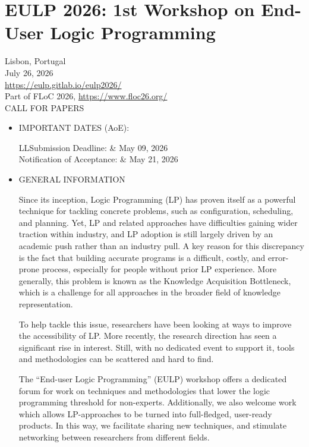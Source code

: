 \documentclass[prodmode,acmtecs]{acmsmall} %
\begin{document}
\section{EULP 2026: 1st Workshop on End-User Logic Programming}\label{EULP2026}  Lisbon, Portugal\\ 
  July 26, 2026\\ 
  \href{https://eulp.gitlab.io/eulp2026/}{https://eulp.gitlab.io/eulp2026/}\\ 
  Part of FLoC 2026, \href{https://www.floc26.org/}{https://www.floc26.org/}\\ 
CALL FOR PAPERS  

\begin{itemize}\item  IMPORTANT DATES (AoE): 
 
\begin{tabulary}{\linewidth}{LL}Submission Deadline:  & May 09, 2026 \\
Notification of Acceptance:  & May 21, 2026 \\
\end{tabulary}
 
\item  GENERAL INFORMATION 
 
  Since its inception, Logic Programming (LP) has proven itself as a powerful technique for tackling concrete problems, such as configuration, scheduling, and planning. Yet, LP and related approaches have difficulties gaining wider traction within industry, and LP adoption is still largely driven by an academic push rather than an industry pull. A key reason for this discrepancy is the fact that building accurate programs is a difficult, costly, and error-prone process, especially for people without prior LP experience. More generally, this problem is known as the Knowledge Acquisition Bottleneck, which is a challenge for all approaches in the broader field of knowledge representation. 
 
  To help tackle this issue, researchers have been looking at ways to improve the accessibility of LP. More recently, the research direction has seen a significant rise in interest. Still, with no dedicated event to support it, tools and methodologies can be scattered and hard to find. 
 
  The ``End-user Logic Programming'' (EULP) workshop offers a dedicated forum for work on techniques and methodologies that lower the logic programming threshold for non-experts. Additionally, we also welcome work which allows LP-approaches to be turned into full-fledged, user-ready products. In this way, we facilitate sharing new techniques, and stimulate networking between researchers from different fields. 
 

\end{itemize}
\end{document}
